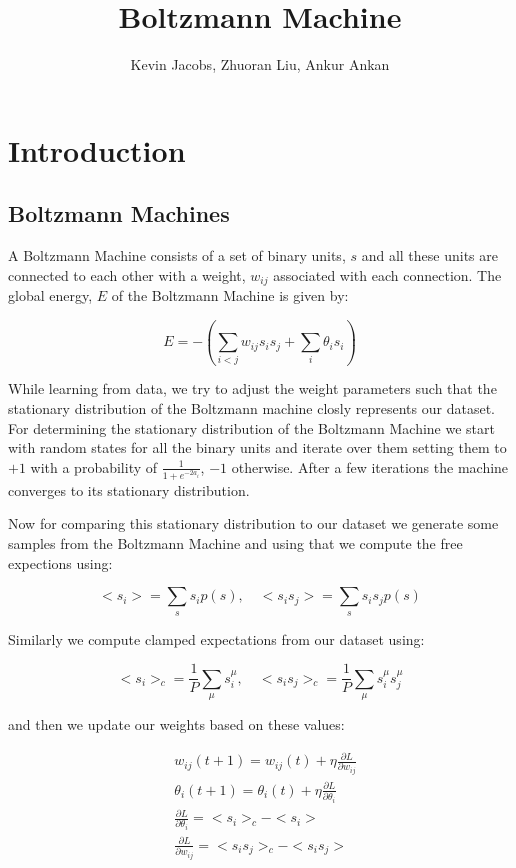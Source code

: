 \documentclass{article}
\title{Boltzmann Machine}
\author{Kevin Jacobs, Zhuoran Liu, Ankur Ankan}
\begin{document}
\section*{Introduction}
\subsection*{Boltzmann Machines}
A Boltzmann Machine consists of a set of binary units, $ s $ and all these units are 
connected to each other with a weight, $ w_{ij} $ associated with each connection.
The global energy, $ E $ of the Boltzmann Machine is given by:

$$ E = - \left(\sum_{i<j} w_{ij} s_i s_j + \sum_{i} \theta_i s_i \right) $$

While learning from data, we try to adjust the weight parameters such that the
stationary distribution of the Boltzmann machine closly represents our dataset.
For determining the stationary distribution of the Boltzmann Machine we start
with random states for all the binary units and iterate over them setting them
to $ +1 $ with a probability of $ \frac {1} {1 + e^{-2a_i}} $, $ -1 $ otherwise.
After a few iterations the machine converges to its stationary distribution.

Now for comparing this stationary distribution to our dataset we generate some
samples from the Boltzmann Machine and using that we compute the free expections
using:

$$ <s_i> = \sum_{s} s_i p(s), \quad <s_i s_j> = \sum_{s} s_i s_j p(s) $$

Similarly we compute clamped expectations from our dataset using:

$$ <s_i>_{c} = \frac{1}{P} \sum_{\mu} s_i^{\mu}, \quad <s_i s_j>_{c} = \frac{1}{P}
\sum_{\mu} s_i^{\mu} s_j^{\mu} $$

and then we update our weights based on these values:

\begin{equation} \begin{split}
& w_{ij} (t+1) = w_{ij}(t) + \eta \frac{\partial L}{\partial w_{ij}} \\
& \theta_i (t+1) = \theta_i (t) + \eta \frac{\partial L}{\partial \theta_i} \\
& \frac{\partial L}{\partial \theta_i} = <s_i>_c - <s_i> \\
& \frac{\partial L}{\partial w_{ij}} = <s_i s_j>_c - <s_i s_j> 
\end{split} \end{equation}
\end{document}
